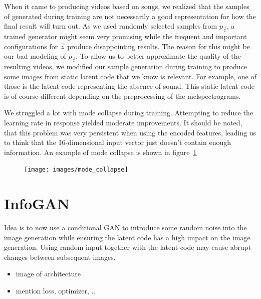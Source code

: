             When it came to producing videos based on songs, we realized that the samples of generated during training are not necessarily a good representation for how the final result will turn out. As we used randomly selected samples from $p_{\vec{z}}$, a trained generator might seem very promising while the frequent and important configurations for $\vec{z}$ produce disappointing results. The reason for this might be our bad modeling of $p_{\vec{z}}$. To allow us to better approximate the quality of the resulting videos, we modified our sample generation during training to produce some images from static latent code that we know is relevant. For example, one of those is the latent code representing the absence of sound. This static latent code is of course different depending on the preprocessing of the melspectrograms.

            We struggled a lot with mode collapse during training. Attempting to reduce the learning rate in response yielded moderate improvements. It should be noted, that this problem was very persistent when using the encoded features, leading us to think that the 16-dimensional input vector just doesn't contain enough information. An example of mode collapse is shown in figure~\ref{fig:mode_collapse}

            \begin{figure}[h]
                \centering
                \texttt{[image: images/mode\_collapse]}
                \caption[]
                {
                    \textbf{}
                }
                \label{fig:mode_collapse}
            \end{figure}

    \section{InfoGAN}

        Idea is to now use a conditional GAN to introduce some random noise into the image generation while ensuring the latent code has a high impact on the image generation. Using random input together with the latent code may cause abrupt changes between subsequent images.
        \begin{itemize}
            \item image of architecture
            \item mention loss, optimizer, ..
        \end{itemize}